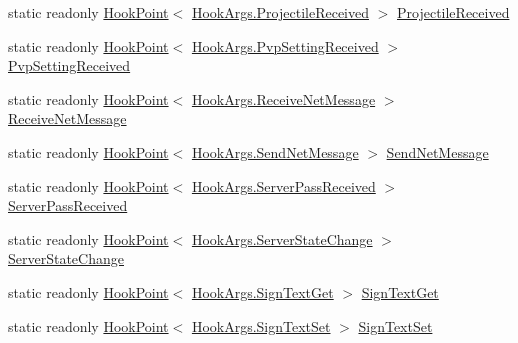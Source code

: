 \begin{DoxyCompactItemize}
static readonly \hyperlink{classOTA_1_1Plugin_1_1HookPoint}{Hook\+Point}$<$ \hyperlink{structOTA_1_1Plugin_1_1HookArgs_1_1ProjectileReceived}{Hook\+Args.\+Projectile\+Received} $>$ \hyperlink{classOTA_1_1Plugin_1_1HookPoints_a5a026c4cde7b8d44fc99a28504f89dde}{Projectile\+Received}
\item 
static readonly \hyperlink{classOTA_1_1Plugin_1_1HookPoint}{Hook\+Point}$<$ \hyperlink{structOTA_1_1Plugin_1_1HookArgs_1_1PvpSettingReceived}{Hook\+Args.\+Pvp\+Setting\+Received} $>$ \hyperlink{classOTA_1_1Plugin_1_1HookPoints_aa299f501a775e9c36ae173e59d4c54a8}{Pvp\+Setting\+Received}
\item 
static readonly \hyperlink{classOTA_1_1Plugin_1_1HookPoint}{Hook\+Point}$<$ \hyperlink{structOTA_1_1Plugin_1_1HookArgs_1_1ReceiveNetMessage}{Hook\+Args.\+Receive\+Net\+Message} $>$ \hyperlink{classOTA_1_1Plugin_1_1HookPoints_a00ce9b8e1f250959691f30e2b58e4661}{Receive\+Net\+Message}
\item 
static readonly \hyperlink{classOTA_1_1Plugin_1_1HookPoint}{Hook\+Point}$<$ \hyperlink{structOTA_1_1Plugin_1_1HookArgs_1_1SendNetMessage}{Hook\+Args.\+Send\+Net\+Message} $>$ \hyperlink{classOTA_1_1Plugin_1_1HookPoints_ab0ce2a0f1563c6d98a53fca9c01d361a}{Send\+Net\+Message}
\item 
static readonly \hyperlink{classOTA_1_1Plugin_1_1HookPoint}{Hook\+Point}$<$ \hyperlink{structOTA_1_1Plugin_1_1HookArgs_1_1ServerPassReceived}{Hook\+Args.\+Server\+Pass\+Received} $>$ \hyperlink{classOTA_1_1Plugin_1_1HookPoints_a1c41810f09ed8dcb8ad52f229ebb4907}{Server\+Pass\+Received}
\item 
static readonly \hyperlink{classOTA_1_1Plugin_1_1HookPoint}{Hook\+Point}$<$ \hyperlink{structOTA_1_1Plugin_1_1HookArgs_1_1ServerStateChange}{Hook\+Args.\+Server\+State\+Change} $>$ \hyperlink{classOTA_1_1Plugin_1_1HookPoints_a3e6b4c9b9dc823d717f738504eaae6db}{Server\+State\+Change}
\item 
static readonly \hyperlink{classOTA_1_1Plugin_1_1HookPoint}{Hook\+Point}$<$ \hyperlink{structOTA_1_1Plugin_1_1HookArgs_1_1SignTextGet}{Hook\+Args.\+Sign\+Text\+Get} $>$ \hyperlink{classOTA_1_1Plugin_1_1HookPoints_a042831a883cab3bd551048bce7c6c835}{Sign\+Text\+Get}
\item 
static readonly \hyperlink{classOTA_1_1Plugin_1_1HookPoint}{Hook\+Point}$<$ \hyperlink{structOTA_1_1Plugin_1_1HookArgs_1_1SignTextSet}{Hook\+Args.\+Sign\+Text\+Set} $>$ \hyperlink{classOTA_1_1Plugin_1_1HookPoints_af513e0abacbebbdb8b43033421b20d2c}{Sign\+Text\+Set}
\item 

\end{DoxyCompactItemize}
